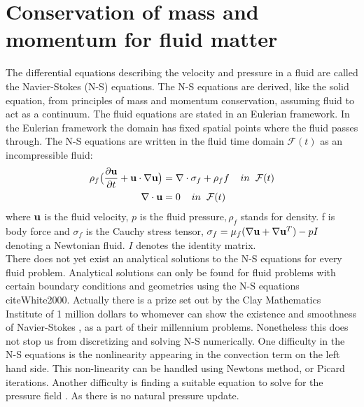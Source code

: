 \section{Conservation of mass and momentum for fluid matter}
The differential equations describing the velocity and pressure in a fluid are called the Navier-Stokes (N-S) equations. The N-S equations are derived, like the solid equation, from principles of mass and momentum conservation, assuming fluid to act as a continuum.
The fluid equations are stated in an Eulerian framework. In the Eulerian framework the domain has fixed spatial points where the fluid passes through. 
The N-S equations are written in the fluid time domain $\mathcal{F}(t)$ as an incompressible fluid:
\begin{align}
\label{eq:NS}
\rho_f\big( \frac{\partial \bold{u}}{\partial t} +  \bold{u} \cdot \nabla \bold{u}\big) &= \nabla \cdot \sigma_f + \rho_ff  \hspace{4mm} in \hspace{2mm} \mathcal{F}(t)\\
\nabla \cdot \bold{u} &= 0 \hspace{4mm} in \hspace{2mm} \mathcal{F}(t)
\end{align}
where $\bold{u}$ is the fluid velocity, $p$ is the fluid pressure$, \rho_f$ stands for density. f is body force and $\sigma_f$ is the Cauchy stress tensor, $ \sigma_f = \mu_f (\nabla \bold{u} + \nabla \bold{u}^T)  - pI$ denoting a Newtonian fluid. $I$ denotes the identity matrix. \\

There does not yet exist an analytical solutions to the N-S equations for every fluid problem. 
Analytical solutions can only be found for fluid problems with certain boundary conditions and geometries using the N-S equations cite{White2000}. Actually there is a prize set out by the Clay Mathematics Institute of 1 million dollars to whomever can show the existence and smoothness of Navier-Stokes \cite{Fefferman2000}, as a part of their millennium problems. 
Nonetheless this does not stop us from discretizing and solving N-S numerically. One difficulty in the N-S equations is the nonlinearity appearing in the convection term on the left hand side. This non-linearity can be handled using Newtons method, or Picard iterations. Another difficulty is finding a suitable equation to solve for the pressure field \cite{Charlesworth2003}. As there is no natural pressure update. 